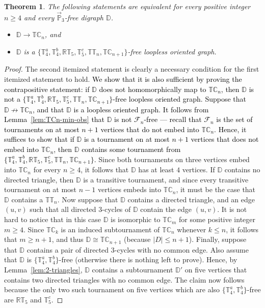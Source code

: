 \documentclass{article}
\newtheorem{theorem}{Theorem}
\theoremstyle{definition}
\theoremstyle{remark}
\newcommand{\blue}[1]{\textcolor{black}{#1}}
\newcommand{\bC}{{\mathbb C}}
\newcommand{\bD}{{\mathbb D}}
\newcommand{\bP}{{\mathbb P}}
\newcommand{\bR}{{\mathbb R}}
\newcommand{\bT}{{\mathbb T}}
\newcommand{\calF}{{\mathcal F}}
\begin{document}
\begin{theorem}\label{thm:TCn-min-obs}
    The following statements are equivalent for 
    every positive integer $n\ge 4$ and every $\vec{\bP}_3$-free digraph
    $\bD$.
    \begin{itemize}
        \item $\bD \to \bT\bC_n$, and
        \item $\bD$ is a $\{\bT_4^a,\bT_4^b, \bR\bT_5, \bT_5^c, \bT\bT_n,\bT\bC_{n+1}\}$-free
        loopless oriented graph.
    \end{itemize}
\end{theorem}
\begin{proof}
    The second itemized statement is clearly a necessary condition for the first itemized statement to 
    hold. \blue{We show that it is also sufficient by proving the contrapositive statement:
    if $\bD$ does not homomorphically map to $\bT\bC_n$, then $\bD$ is not a
    $\{\bT_4^a,\bT_4^b, \bR\bT_5, \bT_5^c, \bT\bT_n,\bT\bC_{n+1}\}$-free loopless oriented graph.
    Suppose that $\bD\not\to \bT\bC_n$, and that $\bD$ is a loopless oriented graph. It follows
    from  Lemma~\ref{lem:TCn-min-obs} that $\bD$ is not $\calF_n$-free --- recall that $\calF_n$
    is the set of tournaments on at most $n+1$ vertices that do not embed into $\bT\bC_n$. Hence,
    it suffices to show that if $\bD$ is a tournament on at most $n+1$ vertices that does not embed
    into $\bT\bC_n$, then $\bD$ contains some tournament from $\{\bT_4^a,\bT_4^b, \bR\bT_5, \bT_5^c,
    \bT\bT_n,\bT\bC_{n+1}\}$.} Since both tournaments on three vertices embed into $\bT\bC_n$ for every
    $n\ge 4$, it follows that $\bD$ has at least $4$ vertices.
    If $\bD$ contains no directed triangle, then $\bD$ is a transitive tournament, and since
    every transitive tournament on at most $n-1$ vertices embeds into $\bT\bC_n$, it must be the
    case that $\bD$ contains a $\bT\bT_n$. Now suppose that $\bD$ contains a directed triangle, 
    and an edge $(u,v)$ such that all directed $3$-cycles of $\bD$ contain the edge $(u,v)$. It
    is not hard to notice that in this case $\bD$ is isomorphic to $\bT\bC_m$ for some positive
    integer $m\ge 4$. Since $\bT\bC_k$ is an induced subtournament of $\bT\bC_n$ whenever $k \le n$, 
    it follows that $m\ge n+1$, and thus $\bD\cong \bT\bC_{n+1}$ (because $|D|\leq n+1$). Finally,
    suppose that $\bD$ contains a pair of directed $3$-cycles with no common edge. Also assume
    that $\bD$ is $\{\bT_4^a,\bT_4^b\}$-free (otherwise there is nothing left to prove). Hence,
    by Lemma~\ref{lem:2-triangles}, $\bD$ contains a subtournament $\bD'$ on five vertices that contains
    two directed triangles with no common edge. The claim now follows because the only two
    such tournament on five vertices which are also $\{\bT_4^a,\bT_4^b\}$-free are $\bR\bT_5$ and
    $\bT_5^c$.
\end{proof}
\end{document}
